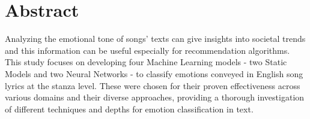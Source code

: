 \firstchapter
\chapter*{Abstract}
\label{ch:abstract}
Analyzing the emotional tone of songs' texts can give insights into societal
trends and this information can be useful especially for recommendation
algorithms. This study focuses on developing four Machine Learning models - two Static Models
and two Neural Networks - to classify emotions conveyed in English song lyrics at the stanza level.
These were chosen for their proven effectiveness across various domains and
their diverse approaches, providing a thorough investigation of different
techniques and depths for emotion classification in text.
